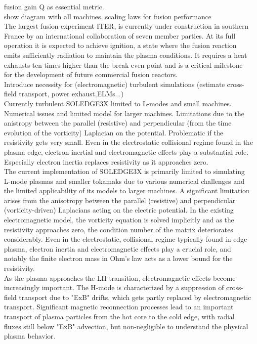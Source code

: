 fusion gain Q as essential metric. \\

show diagram with all machines, scaling laws for fusion performance \\

The largest fusion experiment ITER, is currently under construction in southern France by an international collaboration of seven member parties. At its full operation it is expected to achieve ignition, a state where the fusion reaction emits sufficiently radiation to maintain the plasma conditions. It requires a heat exhausts ten times higher than the break-even point and is a critical milestone for the development of future commercial fusion reactors. \\

Introduce necessity for (electromagnetic) turbulent simulations (estimate cross-field transport, power exhaust,ELMs...)  \\

Currently turbulent SOLEDGE3X limited to L-modes and small machines. Numerical issues and limited model for larger machines. Limitations due to the anistropy between the parallel (resistive) and perpendicular (from the time evolution of the vorticity) Laplacian on the potential. Problematic if the resistivity gets very small. Even in the electrostatic collisional regime found in the plasma edge, electron inertial and electromagnetic effects play a substantial role. Especially electron inertia replaces resistivity as it approaches zero. \\

The current implementation of SOLEDGE3X is primarily limited to simulating L-mode plasmas and smaller tokamaks due to various numerical challenges and the limited applicability of its models to larger machines. A significant limitation arises from the anisotropy between the parallel (resistive) and perpendicular (vorticity-driven) Laplacians acting on the electric potential. In the existing electromagnetic model, the vorticity equation is solved implicitly and as the resistivity approaches zero, the condition number of the matrix deteriorates considerably. Even in the electrostatic, collisional regime typically found in edge plasma, electron inertia and electromagnetic effects play a crucial role, and notably the finite electron mass in Ohm's law acts as a lower bound for the resistivity. \\

As the plasma approaches the LH transition, electromagnetic effects become increasingly important. The H-mode is characterized by a suppression of cross-field transport due to "ExB" drifts, which gets partly replaced by electromagnetic transport. Significant magnetic reconnection processes lead to an important transport of plasma particles from the hot core to the cold edge, with radial fluxes still below "ExB" advection, but non-negligible to understand the physical plasma behavior. \\

